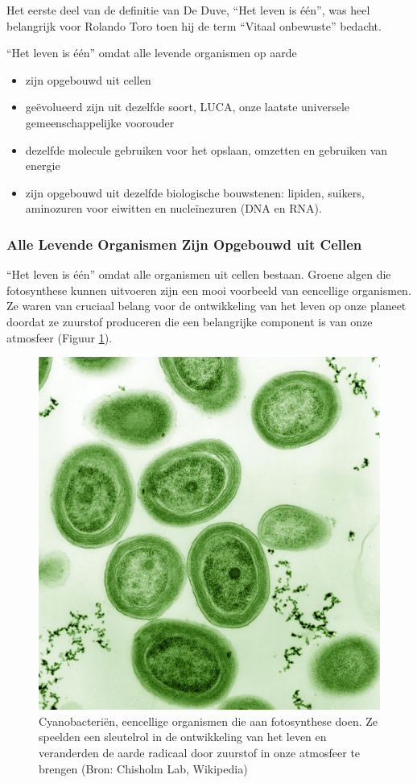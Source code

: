 \documentclass[
  11pt,
]{book}
\providecommand{\tightlist}{%
  \setlength{\itemsep}{0pt}\setlength{\parskip}{0pt}}
\begin{document}
Het eerste deel van de definitie van De Duve, ``Het leven is één'', was heel belangrijk voor Rolando Toro toen hij de term ``Vitaal onbewuste'' bedacht.

``Het leven is één'' omdat alle levende organismen op aarde

\begin{itemize}
\tightlist
\item
  zijn opgebouwd uit cellen
\item
  geëvolueerd zijn uit dezelfde soort, LUCA, onze laatste universele gemeenschappelijke voorouder
\item
  dezelfde molecule gebruiken voor het opslaan, omzetten en gebruiken van energie
\item
  zijn opgebouwd uit dezelfde biologische bouwstenen: lipiden, suikers, aminozuren voor eiwitten en nucleïnezuren (DNA en RNA).
\end{itemize}

\hypertarget{alle-levende-organismen-zijn-opgebouwd-uit-cellen}{%
\subsubsection{Alle Levende Organismen Zijn Opgebouwd uit Cellen}\label{alle-levende-organismen-zijn-opgebouwd-uit-cellen}}

``Het leven is één'' omdat alle organismen uit cellen bestaan. Groene algen die fotosynthese kunnen uitvoeren zijn een mooi voorbeeld van eencellige organismen. Ze waren van cruciaal belang voor de ontwikkeling van het leven op onze planeet doordat ze zuurstof produceren die een belangrijke component is van onze atmosfeer (Figuur \ref{fig:greenAlgae}).

\begin{figure}

{\centering \includegraphics[width=0.3\linewidth]{./figs/Prochlorococcus_marinus} 

}

\caption{Cyanobacteriën, eencellige organismen die aan fotosynthese doen. Ze speelden een sleutelrol in de ontwikkeling van het leven en veranderden de aarde radicaal door zuurstof in onze atmosfeer te brengen (Bron: Chisholm Lab, Wikipedia)}\label{fig:greenAlgae}
\end{figure}
\end{document}
